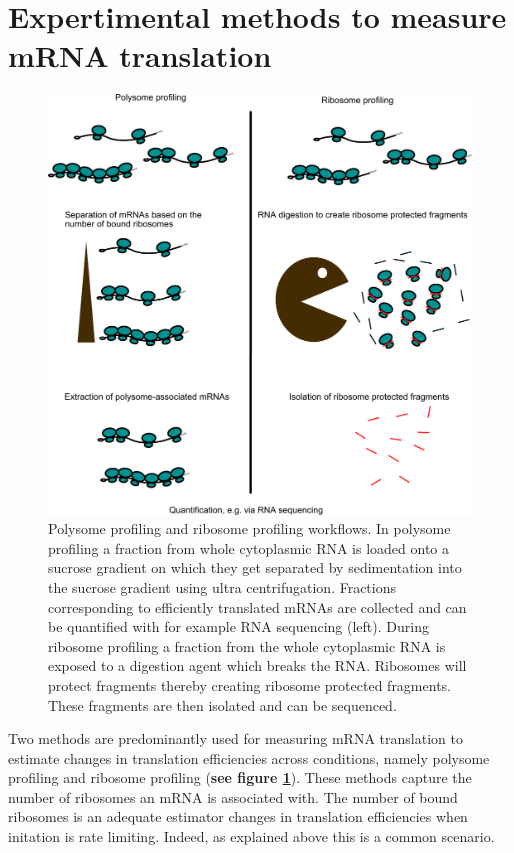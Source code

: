 \documentclass[12pt,openany]{book}
\begin{document}
\clearpage
\section{Expertimental methods to measure mRNA translation} \label{exptMethod}

\begin{figure}
    \includegraphics{./figures/polyRibo.pdf}
  \caption{Polysome profiling and ribosome profiling workflows. In polysome profiling a fraction from whole cytoplasmic RNA is loaded onto a sucrose gradient on which they get separated by sedimentation into the sucrose gradient using ultra centrifugation. Fractions corresponding to efficiently translated mRNAs are collected and can be quantified with for example RNA sequencing (left). During ribosome profiling a fraction from the whole cytoplasmic RNA is exposed to a digestion agent which breaks the RNA. Ribosomes will protect fragments thereby creating ribosome protected fragments. These fragments are then isolated and can be sequenced.  \label{fig:polyRibo}}
\end{figure}

Two methods are predominantly used for measuring mRNA translation to
estimate changes in translation efficiencies across conditions, namely
polysome profiling and ribosome profiling (\textbf{see figure
\ref{fig:polyRibo}}). These methods capture the number of ribosomes an
mRNA is associated with. The number of bound ribosomes is an adequate
estimator changes in translation efficiencies when initation is rate
limiting. Indeed, as explained above this is a common scenario.
\end{document}
